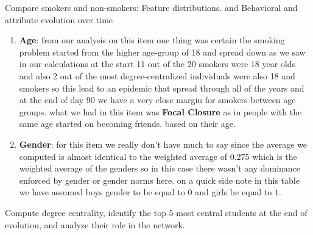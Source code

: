 \begin{question}
\begin{subquestion}{Compare smokers and non-smokers: Feature distributions. and Behavioral and attribute evolution over time}
{\begin{enumerate}
			\item  \textbf{Age}: from our analysis on this item one thing was certain the smoking problem started from the higher age-group of 18 and spread down as we saw in our calculations at the start 11 out of the 20 smokers were 18 year olds and also 2 out of the most degree-centralized individuals were also 18 and smokers so this lead to an epidemic that spread through all of the years and at the end of day 90 we have a very close margin for smokers between age groups. what we had in this item was \textbf{Focal Closure} as in people with the same age started on becoming friends. based on their age.
			\item  \textbf{Gender}: for this item we really don't have much to say since the average we computed is almost identical to the weighted average of $0.275$ which is the weighted average of the genders so in this case there wasn't any dominance enforced by gender or gender norms here.  on a quick side note in this table we have assumed boys gender to be equal to $0$ and girls be equal to $1$. 
		\end{enumerate}
	}
	\end{subquestion}
	\begin{subquestion}{Compute degree centrality, identify the top 5 most central students at the end of evolution,
			and analyze their role in the network.}
\end{subquestion}
\end{question}
